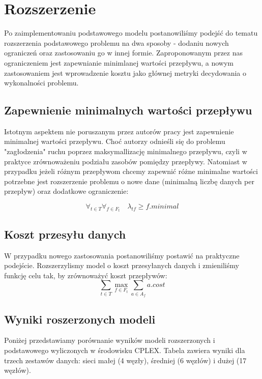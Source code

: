\section{Rozszerzenie}

Po zaimplementowaniu podstawowego modelu postanowiliśmy podejść do tematu
rozszerzenia podstawowego problemu na dwa sposoby - dodaniu nowych ograniczeń
oraz zastosowaniu go w innej formie. Zaproponowanym przez nas ograniczeniem jest
zapewnianie minimlanej wartości przepływu, a nowym zastosowaniem jest wprowadzenie
kosztu jako głównej metryki decydowania o wykonalności problemu.

\subsection{Zapewnienie minimalnych wartości przepływu}

Istotnym aspektem nie poruszanym przez autorów pracy jest zapewnienie
minimalnej wartości przepływu. Choć autorzy odnieśli się do problemu "zagłodzenia"
ruchu poprzez maksymallizację minimalnego przepływu, czyli w praktyce zrównoważeniu
podziału zasobów pomiędzy przepływy. Natomiast w przypadku jeżeli różnym przepływom
chcemy zapewnić różne minimalne wartości potrzebne jest rozszerzenie problemu o
nowe dane (minimalną liczbę danych per przepływ) oraz dodatkowe ograniczenie:

\begin{equation}
  \forall_{t \in T} \forall_{f \in F_t} \quad \lambda_{tf} \ge f.minimal
\end{equation}

\subsection{Koszt przesyłu danych}

W przypadku nowego zastosowania postanowiliśmy postawić na praktyczne podejście.
Rozszerzylismy model o koszt przesyłanych danych i zmieniliśmy funkcję celu tak,
by zrównoważyć koszt przepływów:
\begin{equation}
  \sum_{t \in T} \max_{f \in F_t} \sum_{a \in A_f} a.cost
\end{equation}

\subsection{Wyniki roszerzonych modeli}
Poniżej przedstawiamy porównanie wyników modeli rozszerzonych i podstawowego wyliczonych
w środowisku CPLEX. Tabela zawiera wyniki dla trzech zestawów danych: sieci małej (4 węzły),
średniej (6 węzłów) i dużej (17 węzłów).
